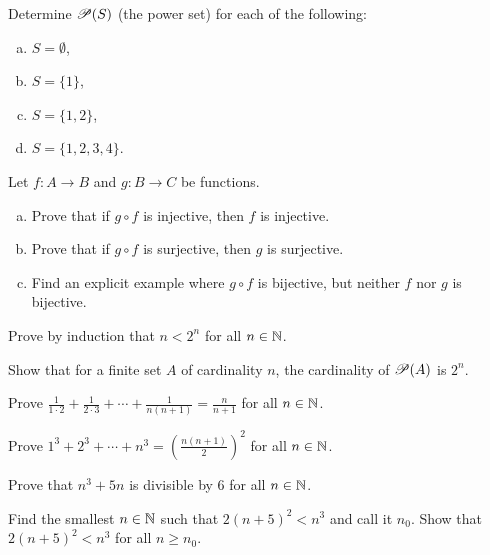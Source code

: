 \begin{samepage}
\begin{exercise}
Determine ${\mathscr{P}}(S)$ (the power set) for each of the following:
\begin{enumerate}[a)]
\item $S = \emptyset$,
\item $S = \{1\}$,
\item $S = \{1,2\}$,
\item $S = \{1,2,3,4\}$.
\end{enumerate}
\end{exercise}
\end{samepage}


\begin{exercise}
Let $f \colon A \to B$ and $g \colon B \to C$ be functions.
\begin{enumerate}[a)]
\item
Prove that if $g \circ f$ is injective, then $f$ is injective.
\item
Prove that if $g \circ f$ is surjective, then $g$ is surjective.
\item
Find an explicit example where $g \circ f$ is bijective, but neither $f$
nor $g$ is bijective.
\end{enumerate}
\end{exercise}

\begin{exercise}
\pagebreak[2]
Prove by induction that $n < 2^n$ for all $n \in {\mathbb{N}}$.
\end{exercise}

\begin{exercise}
Show that for a finite set $A$ of cardinality $n$, the cardinality
of ${\mathscr{P}}(A)$ is $2^n$.
\end{exercise}

\begin{exercise}
Prove $\frac{1}{1\cdot 2} + 
\frac{1}{2\cdot 3} + \cdots + \frac{1}{n(n+1)} = \frac{n}{n+1}$
for all $n \in {\mathbb{N}}$.
\end{exercise}

\begin{exercise}
Prove $1^3 + 2^3 + \cdots + n^3 = {\left( \frac{n(n+1)}{2} \right)}^2$
for all $n \in {\mathbb{N}}$.
\end{exercise}

\begin{exercise}
Prove that $n^3 + 5n$ is divisible by $6$ for all $n \in {\mathbb{N}}$.
\end{exercise}

\begin{exercise}
Find the smallest $n \in {\mathbb{N}}$ such that $2{(n+5)}^2 < n^3$ and call it $n_0$.
Show that $2{(n+5)}^2 < n^3$ for all $n \geq n_0$.
\end{exercise}


